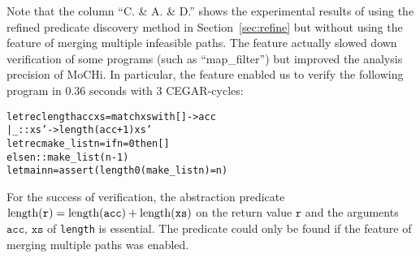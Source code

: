 Note that the column ``C. \& A. \& D.'' shows the experimental results 
of using the refined predicate discovery method in 
Section~\ref{sec:refine} but without using the feature of merging 
multiple infeasible paths.  The feature actually slowed down 
verification of some programs (such as ``map\_filter'') but improved the 
analysis precision of MoCHi.  In particular, the feature enabled us to 
verify the following program in 0.36 seconds with 3 CEGAR-cycles:
\begin{alltt}
let rec length acc xs = match xs with [] -> acc
                      | _::xs' -> length (acc+1) xs'
let rec make_list n = if n = 0 then []
                      else n :: make_list (n-1)
let main n = assert (length 0 (make_list n) = n)
\end{alltt}
For the success of verification, the abstraction predicate 
$\mathrm{length}(\mathtt{r}) = \mathrm{length}(\mathtt{acc}) + \mathrm{length}(\mathtt{xs})$ on 
the return value $\mathtt{r}$ and the arguments $\mathtt{acc}$, 
$\mathtt{xs}$ of \texttt{length} is essential.  The predicate could only 
be found if the feature of merging multiple paths was enabled.


